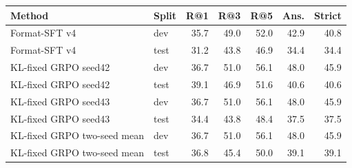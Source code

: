 \begin{tabular}{llrrrrr}
\toprule
Method & Split & R@1 & R@3 & R@5 & Ans. & Strict \\
\midrule
Format-SFT v4 & dev & 35.7 & 49.0 & 52.0 & 42.9 & 40.8 \\
Format-SFT v4 & test & 31.2 & 43.8 & 46.9 & 34.4 & 34.4 \\
KL-fixed GRPO seed42 & dev & 36.7 & 51.0 & 56.1 & 48.0 & 45.9 \\
KL-fixed GRPO seed42 & test & 39.1 & 46.9 & 51.6 & 40.6 & 40.6 \\
KL-fixed GRPO seed43 & dev & 36.7 & 51.0 & 56.1 & 48.0 & 45.9 \\
KL-fixed GRPO seed43 & test & 34.4 & 43.8 & 48.4 & 37.5 & 37.5 \\
KL-fixed GRPO two-seed mean & dev & 36.7 & 51.0 & 56.1 & 48.0 & 45.9 \\
KL-fixed GRPO two-seed mean & test & 36.8 & 45.4 & 50.0 & 39.1 & 39.1 \\
\bottomrule
\end{tabular}
